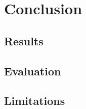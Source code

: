 \documentclass[conference,letterpaper]{IEEEtran}
\begin{document}
    \section{Conclusion}


    \subsection{Results}

    \subsection{Evaluation}

    \subsection{Limitations}

    \newpage
    
     
\end{document}

